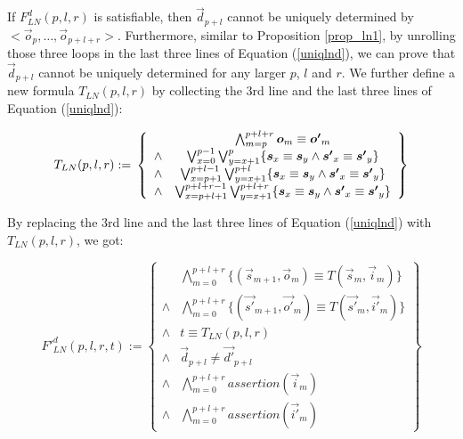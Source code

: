 \documentclass[runningheads,a4paper,orivec]{llncs}
\begin{document}
If $F^d_{LN}(p,l,r)$ is satisfiable,
then $\vec{d}_{p+l}$ cannot be uniquely determined by $<\vec{o}_p,\dots,\vec{o}_{p+l+r}>$.
Furthermore,
similar to Proposition \ref{prop_ln1},
by unrolling those three loops in the last three lines of Equation (\ref{uniqlnd}),
we can prove that $\vec{d}_{p+l}$ cannot be uniquely determined for any larger $p$, $l$ and $r$.
We further define a new formula $T_{LN}(p,l,r)$ by collecting the 3rd line and the last three lines of Equation (\ref{uniqlnd}):

\begin{equation}\label{tln}
T_{LN}(p,l,r):=\\
\left\{
\begin{array}{cc}
      &\bigwedge_{m=p}^{p+l+r}\vec{o}_m\equiv \vec{o'}_m \\
\wedge&\bigvee_{x=0}^{p-1}\bigvee_{y=x+1}^{p} \{\vec{s}_x\equiv \vec{s}_y\wedge \vec{s'}_x\equiv \vec{s'}_y\} \\
\wedge&\bigvee_{x=p+1}^{p+l-1}\bigvee_{y=x+1}^{p+l} \{\vec{s}_x\equiv \vec{s}_y\wedge \vec{s'}_x\equiv \vec{s'}_y\} \\
\wedge&\bigvee_{x=p+l+1}^{p+l+r-1}\bigvee_{y=x+1}^{p+l+r} \{\vec{s}_x\equiv \vec{s}_y\wedge \vec{s'}_x\equiv \vec{s'}_y\}
\end{array}
\right\}
\end{equation}

By replacing the 3rd line and the last three lines of Equation (\ref{uniqlnd}) with $T_{LN}(p,l,r)$,
we got:

\begin{equation}\label{lndef1}
F'^d_{LN}(p,l,r,t):=
\left\{
\begin{array}{cc}
&\bigwedge_{m=0}^{p+l+r}
\{
(\vec{s}_{m+1},\vec{o}_m)\equiv T(\vec{s}_m,\vec{i}_m)
\}
\\
\wedge&\bigwedge_{m=0}^{p+l+r}
\{
(\vec{s'}_{m+1},\vec{o'}_m)\equiv T(\vec{s'}_m,\vec{i'}_m)
\}
\\
\wedge& t\equiv T_{LN}(p,l,r)\\
\wedge& \vec{d}_{p+l}\ne \vec{d'}_{p+l} \\
\wedge&\bigwedge_{m=0}^{p+l+r}assertion(\vec{i}_m) \\
\wedge&\bigwedge_{m=0}^{p+l+r}assertion(\vec{i'}_m) 
\end{array}
\right\}
\end{equation}
\end{document}
